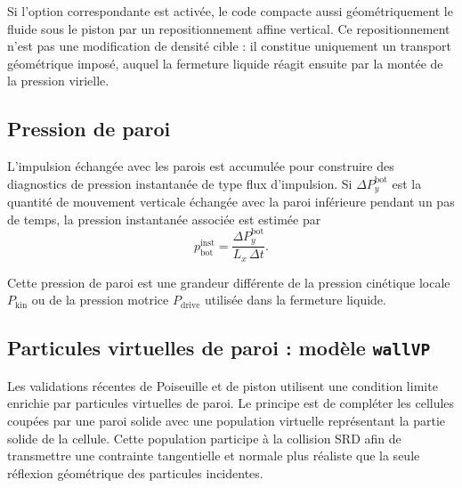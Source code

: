 \documentclass[11pt,a4paper]{article}
\begin{document}
Si l'option correspondante est activée, le code compacte aussi géométriquement le fluide sous le piston par un repositionnement affine vertical. Ce repositionnement n'est pas une modification de densité cible : il constitue uniquement un transport géométrique imposé, auquel la fermeture liquide réagit ensuite par la montée de la pression virielle.

\subsection{Pression de paroi}

L'impulsion échangée avec les parois est accumulée pour construire des diagnostics de pression instantanée de type flux d'impulsion. Si $\Delta P_y^{\mathrm{bot}}$ est la quantité de mouvement verticale échangée avec la paroi inférieure pendant un pas de temps, la pression instantanée associée est estimée par
\begin{equation}
 p_{\mathrm{bot}}^{\mathrm{inst}} = \frac{\Delta P_y^{\mathrm{bot}}}{L_x\,\Delta t}.
\end{equation}

Cette pression de paroi est une grandeur différente de la pression cinétique locale $P_{\mathrm{kin}}$ ou de la pression motrice $P_{\mathrm{drive}}$ utilisée dans la fermeture liquide.


\subsection{Particules virtuelles de paroi : modèle \texttt{wallVP}}

Les validations récentes de Poiseuille et de piston utilisent une condition limite enrichie par particules virtuelles de paroi. Le principe est de compléter les cellules coupées par une paroi solide avec une population virtuelle représentant la partie solide de la cellule. Cette population participe à la collision SRD afin de transmettre une contrainte tangentielle et normale plus réaliste que la seule réflexion géométrique des particules incidentes.
\end{document}
